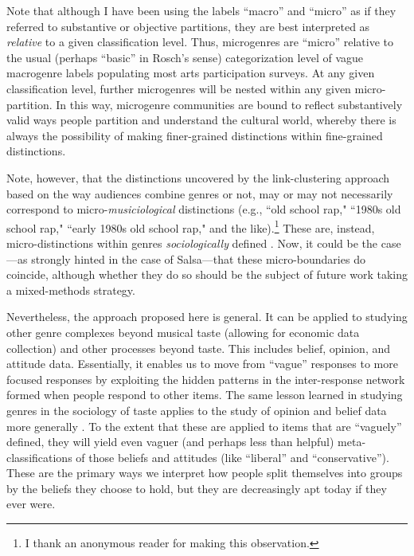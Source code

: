 \documentclass[a4paper,12pt]{extarticle}
\begin{document}
Note that although I have been using the labels ``macro'' and ``micro'' as if they referred to substantive or objective partitions, they are best interpreted as {\em relative} to a given classification level. Thus, microgenres are ``micro'' relative to the usual (perhaps ``basic'' in Rosch's \citeyearpar{Rosch1978-ue} sense) categorization level of vague macrogenre labels populating most arts participation surveys. At any given classification level, further microgenres will be nested within any given micro-partition. In this way, microgenre communities are bound to reflect substantively valid ways people partition and understand the cultural world, whereby there is always the possibility of making finer-grained distinctions within fine-grained distinctions. 

Note, however, that the distinctions uncovered by the link-clustering approach based on the way audiences combine genres or not, may or may not necessarily correspond to micro-\textit{musiciological} distinctions (e.g., ``old school rap," ``1980s old school rap," ``early 1980s old school rap," and the like).\footnote{I thank an anonymous reader for making this observation.} These are, instead, micro-distinctions within genres \textit{sociologically} defined \citep{lena2015relational}. Now, it could be the case---as strongly hinted in the case of Salsa---that these micro-boundaries do coincide, although whether they do so should be the subject of future work taking a mixed-methods strategy. 

Nevertheless, the approach proposed here is general. It can be applied to studying other genre complexes beyond musical taste (allowing for economic data collection) and other processes beyond taste. This includes belief, opinion, and attitude data. Essentially, it enables us to move from ``vague'' responses to more focused responses by exploiting the hidden patterns in the inter-response network formed when people respond to other items. The same lesson learned in studying genres in the sociology of taste applies to the study of opinion and belief data more generally \citep{boutyline2017belief}. To the extent that these are applied to items that are ``vaguely'' defined, they will yield even vaguer (and perhaps less than helpful) meta-classifications of those beliefs and attitudes (like ``liberal'' and ``conservative''). These are the primary ways we interpret how people split themselves into groups by the beliefs they choose to hold, but they are decreasingly apt today if they ever were. 
 


\end{document}
